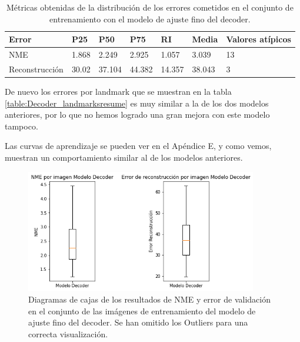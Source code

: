     \begin{table}[!ht]
            \centering
            \caption{Métricas obtenidas de la distribución de los errores cometidos en el conjunto de entrenamiento con el modelo de ajuste fino del decoder.}
            \begin{tabular}{|l|l|l|l|l|l|l|}
            \hline
            \cellcolor{gray!25}\textbf{Error} & \cellcolor{gray!25}\textbf{P25} & \cellcolor{gray!25}\textbf{P50} & \cellcolor{gray!25}\textbf{P75} & \cellcolor{gray!25}\textbf{RI} & \cellcolor{gray!25}\textbf{Media} & \cellcolor{gray!25}\textbf{Valores atípicos}\\ \hline
                NME & 1.868 & 2.249 & 2.925 & 1.057 & 3.039 & 13 \\ \hline
                Reconstrucción & 30.02 & 37.104 & 44.382 & 14.357 & 38.043 & 3 \\ \hline
            \end{tabular}
            \label{table:ModelDecoder_images_results}
        \end{table}

        \medskip 

        \noindent De nuevo los errores por landmark que se muestran en la tabla \autoref{table:Decoder_landmarksresume} es muy similar a la de los dos modelos anteriores, por lo que no hemos logrado una gran mejora con este modelo tampoco.

        \medskip

        \noindent Las curvas de aprendizaje se pueden ver en el Apéndice E, y como vemos, muestran un comportamiento similar al de los modelos anteriores. 

        \begin{figure}[H]
            \centering
            \includegraphics[width=0.9\textwidth]{img/boxplot_decoder.png}
            \caption{Diagramas de cajas de los resultados de NME y error de validación en el conjunto de las imágenes de entrenamiento del modelo de ajuste fino del decoder. Se han omitido los Outliers para una correcta visualización.}
            \label{fig:boxplot_ModeloDecoder_NME}
        \end{figure}

